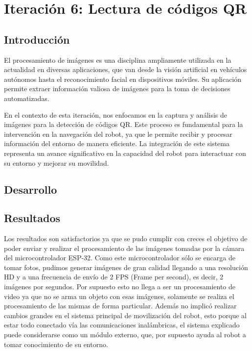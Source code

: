 \newpage
\section{Iteración 6: Lectura de códigos QR}

\subsection{Introducción}

El procesamiento de imágenes es una disciplina ampliamente utilizada en la actualidad en diversas aplicaciones, que van desde la visión artificial en vehículos autónomos hasta el reconocimiento facial en dispositivos móviles. Su aplicación permite extraer información valiosa de imágenes para la toma de decisiones automatizadas.

En el contexto de esta iteración, nos enfocamos en la captura y análisis de imágenes para la detección de códigos QR. Este proceso es fundamental para la intervención en la navegación del robot, ya que le permite recibir y procesar información del entorno de manera eficiente. La integración de este sistema representa un avance significativo en la capacidad del robot para interactuar con su entorno y mejorar su movilidad.



\subsection{Desarrollo}









\subsection{Resultados}
Los resultados son satisfactorios ya que se pudo cumplir con creces el objetivo de poder enviar y realizar el procesamiento de las imágenes tomadas por la cámara del microcontrolador ESP-32. Como este microcontrolador sólo se encarga de tomar fotos, pudimos generar imágenes de gran calidad llegando a una resolución HD y a una frecuencia de envío de 2 FPS (Frame per second), es decir, 2 imágenes por segundos. Por supuesto esto no llega a ser un procesamiento de video ya que no se arma un objeto con esas imágenes, solamente se realiza el procesamiento de las mismas de forma particular.
Además no implicó realizar cambios grandes en el sistema principal de movilización del robot, esto porque al estar todo conectado vía las comunicaciones inalámbricas, el sistema explicado puede considerarse como un módulo externo, que, por supuesto ayuda al robot a tomar conocimiento de su entorno.

